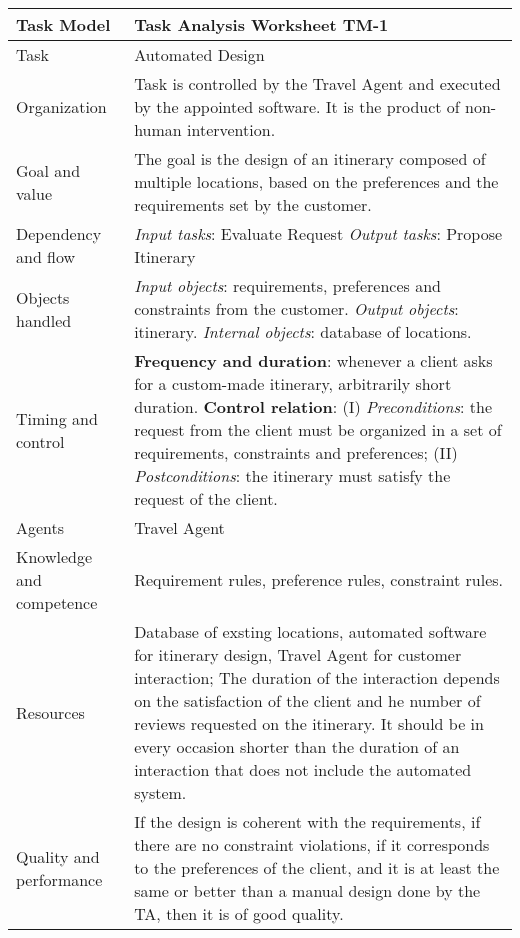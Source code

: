 \begin{tabular}%
       {|p{3cm}%
        |p{9.5cm}|}
\hline
{\bf Task Model} &
{\bf Task Analysis Worksheet TM-1} \\
\hline
\hline
\sc Task & 
   Automated Design
\\
\hline
\sc Organization & 
   Task is controlled by the Travel Agent and executed by the appointed software. It is the product of non-human intervention.
\\
\hline
\sc Goal and value &
   The goal is the design of an itinerary composed of multiple locations, based on the preferences and the requirements set by the customer. 
\\
\hline
\sc Dependency and flow &
   {\em Input tasks}: Evaluate Request
	\newline
   {\em Output tasks}: Propose Itinerary \newline
\\
\hline
\sc Objects handled &
   {\em Input objects}: requirements, preferences and constraints from the customer.
\newline
   {\em Output objects}: itinerary.
\newline
   {\em Internal objects}: database of locations.
\newline
\\
\hline
\sc Timing and control & 
\textbf{Frequency and duration}: whenever a client asks for a custom-made itinerary, arbitrarily short duration. \newline
\textbf{Control relation}: \newline %
(I) {\em Preconditions}: the request from the client must be organized in a set of requirements, constraints and preferences; \newline
(II) {\em Postconditions}: the itinerary must satisfy the request of the client.
\\
\hline
\sc Agents & 
   Travel Agent
\\
\hline
\sc Knowledge and competence & 
   Requirement rules, preference rules, constraint rules.
\\
\hline
\sc Resources & 
   Database of exsting locations, automated software for itinerary design, Travel Agent for customer interaction; 
\newline
   The duration of the interaction depends on the satisfaction of the client and he number of reviews requested on the itinerary. It should be in every occasion shorter than the duration of an interaction that does not include the automated system.
\\
\hline
\sc Quality and performance & 
   If the design is coherent with the requirements, if there are no constraint violations, if it corresponds to the preferences of the client, and it is at least the same or better than a manual design done by the TA, then it is of good quality.
\\
\hline
\end{tabular}

